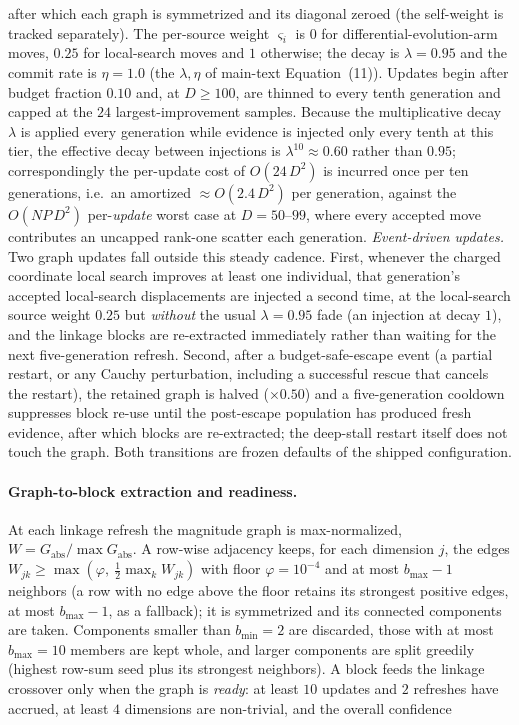 \documentclass[10pt,a4paper]{article}
\begin{document}
after which each graph is symmetrized and its diagonal zeroed (the self-weight
is tracked separately).  The per-source weight $\varsigma_i$ is $0$ for
differential-evolution-arm moves, $0.25$ for local-search moves and $1$
otherwise; the decay is $\lambda=0.95$ and the commit rate is $\eta=1.0$ (the
$\lambda,\eta$ of main-text Equation~(11)).  Updates begin after budget fraction $0.10$
and, at $D\ge 100$, are thinned to every tenth generation and capped at the $24$
largest-improvement samples.  Because the multiplicative decay $\lambda$ is applied
every generation while evidence is injected only every tenth at this tier, the
effective decay between injections is $\lambda^{10}\approx 0.60$ rather than $0.95$;
correspondingly the per-update cost of $O(24\,D^2)$ is incurred once per ten
generations, i.e.\ an amortized $\approx O(2.4\,D^2)$ per generation, against the
$O(NP\,D^2)$ per-\emph{update} worst case at $D=50$--$99$, where every accepted move
contributes an uncapped rank-one scatter each generation.
\emph{Event-driven updates.} Two graph updates fall outside this steady cadence. First, whenever the charged coordinate local search improves at least one individual, that generation's accepted local-search displacements are injected a second time, at the local-search source weight $0.25$ but \emph{without} the usual $\lambda=0.95$ fade (an injection at decay $1$), and the linkage blocks are re-extracted immediately rather than waiting for the next five-generation refresh. Second, after a budget-safe-escape event (a partial restart, or any Cauchy perturbation, including a successful rescue that cancels the restart), the retained graph is halved ($\times 0.50$) and a five-generation cooldown suppresses block re-use until the post-escape population has produced fresh evidence, after which blocks are re-extracted; the deep-stall restart itself does not touch the graph. Both transitions are frozen defaults of the shipped configuration.


\paragraph{Graph-to-block extraction and readiness.}
At each linkage refresh the magnitude graph is max-normalized,
$W = G_{\mathrm{abs}}/\max G_{\mathrm{abs}}$.  A row-wise adjacency keeps, for
each dimension $j$, the edges $W_{jk}\ge \max\!\left(\varphi,\ \tfrac12\max_k
W_{jk}\right)$ with floor $\varphi=10^{-4}$ and at most $b_{\max}-1$ neighbors
(a row with no edge above the floor retains its strongest positive edges, at
most $b_{\max}-1$, as a fallback);
it is symmetrized and its connected components are taken.  Components smaller
than $b_{\min}=2$ are discarded, those with at most $b_{\max}=10$ members are
kept whole, and larger components are split greedily (highest row-sum seed plus
its strongest neighbors).  A block feeds the linkage crossover only when the
graph is \emph{ready}: at least $10$ updates and $2$ refreshes have accrued, at
least $4$ dimensions are non-trivial, and the overall confidence
\end{document}
